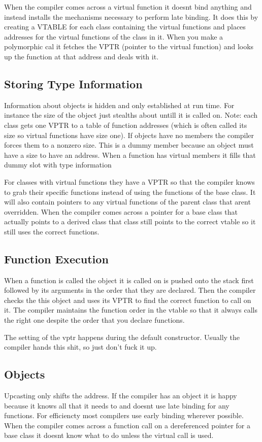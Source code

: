 \documentclass[12pt]{article}
\begin{document}
When the compiler comes across a virtual function it doesnt bind anything and instead installs the mechanisms necessary to perform late binding. It does this by creating a VTABLE for each class containing the virtual functions and places addresses for the virtual functions of the class in it. When you make a polymorphic cal it fetches the VPTR (pointer to the virtual function) and looks up the function at that address and deals with it.

\subsection*{Storing Type Information}
Information about objects is hidden and only established at run time. For instance the size of the object just stealths about untill it is called on. Note: each class gets one VPTR to a table of function addresses (which is often called its size so virtual functions have size one). If objects have no members the compiler forces them to a nonzero size. This is a dummy member because an object must have a size to have an address. When a function has virtual members it fills that dummy slot with type information

For classes with virtual functions they have a VPTR so that the compiler knows to grab their specific functions instead of using the functions of the base class. It will also contain pointers to any virtual functions of the parent class that arent overridden. When the compiler comes across a pointer for a base class that actually points to a derived class that class still points to the correct vtable so it still uses the correct functions.

\subsection*{Function Execution}
When a function is called the object it is called on is pushed onto the stack first followed by its arguments in the order that they are declared. Then the compiler checks the this object and uses its VPTR to find the correct function to call on it. The compiler maintains the function order in the vtable so that it always calls the right one despite the order that you declare functions.

The setting of the vptr happens during the default constructor. Usually the compiler hands this shit, so just don't fuck it up.

\subsection*{Objects}
Upcasting only shifts the address. If the compiler has an object it is happy because it knows all that it needs to and doesnt use late binding for any functions. For efficiencty most compilers use early binding wherever possible. When the compiler comes across a function call on a dereferenced pointer for a base class it doesnt know what to do unless the virtual call is used.
\end{document}
